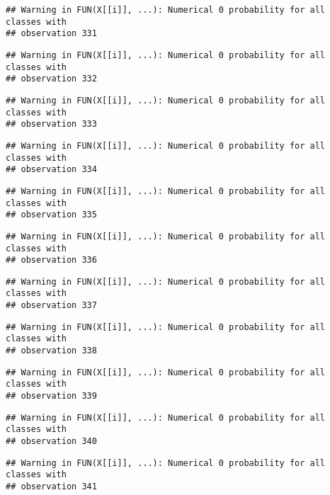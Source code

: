 \documentclass[
]{article}
\begin{document}
\begin{verbatim}
## Warning in FUN(X[[i]], ...): Numerical 0 probability for all classes with
## observation 331
\end{verbatim}

\begin{verbatim}
## Warning in FUN(X[[i]], ...): Numerical 0 probability for all classes with
## observation 332
\end{verbatim}

\begin{verbatim}
## Warning in FUN(X[[i]], ...): Numerical 0 probability for all classes with
## observation 333
\end{verbatim}

\begin{verbatim}
## Warning in FUN(X[[i]], ...): Numerical 0 probability for all classes with
## observation 334
\end{verbatim}

\begin{verbatim}
## Warning in FUN(X[[i]], ...): Numerical 0 probability for all classes with
## observation 335
\end{verbatim}

\begin{verbatim}
## Warning in FUN(X[[i]], ...): Numerical 0 probability for all classes with
## observation 336
\end{verbatim}

\begin{verbatim}
## Warning in FUN(X[[i]], ...): Numerical 0 probability for all classes with
## observation 337
\end{verbatim}

\begin{verbatim}
## Warning in FUN(X[[i]], ...): Numerical 0 probability for all classes with
## observation 338
\end{verbatim}

\begin{verbatim}
## Warning in FUN(X[[i]], ...): Numerical 0 probability for all classes with
## observation 339
\end{verbatim}

\begin{verbatim}
## Warning in FUN(X[[i]], ...): Numerical 0 probability for all classes with
## observation 340
\end{verbatim}

\begin{verbatim}
## Warning in FUN(X[[i]], ...): Numerical 0 probability for all classes with
## observation 341
\end{verbatim}
\end{document}
